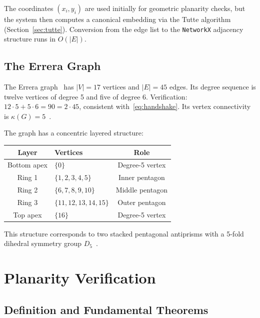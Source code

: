 \documentclass[12pt,letterpaper]{article}
\theoremstyle{plain}
\theoremstyle{definition}
\theoremstyle{remark}
\begin{document}
The coordinates $(x_i, y_i)$ are used initially for geometric planarity checks,
but the system then computes a canonical embedding via the Tutte algorithm
(Section~\ref{sec:tutte}). Conversion from the edge list to the \texttt{NetworkX}
adjacency structure runs in $O(|E|)$.

\subsection{The Errera Graph}

The Errera graph~\cite{errera1921} has $|V| = 17$ vertices and $|E| = 45$
edges. Its degree sequence is twelve vertices of degree 5 and five of degree 6.
Verification: $12 \cdot 5 + 5 \cdot 6 = 90 = 2 \cdot 45$,
consistent with~\eqref{eq:handshake}. Its vertex connectivity is
$\kappa(G) = 5$~\cite{errera1921}.

The graph has a concentric layered structure:

\begin{center}
\begin{tabular}{clc}
\toprule
\textbf{Layer} & \textbf{Vertices} & \textbf{Role} \\
\midrule
Bottom apex & $\{0\}$            & Degree-5 vertex \\
Ring 1      & $\{1,2,3,4,5\}$   & Inner pentagon \\
Ring 2      & $\{6,7,8,9,10\}$  & Middle pentagon \\
Ring 3      & $\{11,12,13,14,15\}$ & Outer pentagon \\
Top apex    & $\{16\}$           & Degree-5 vertex \\
\bottomrule
\end{tabular}
\end{center}

This structure corresponds to two stacked pentagonal antiprisms with a
5-fold dihedral symmetry group $D_5$~\cite{errera1921}.

\section{Planarity Verification}

\subsection{Definition and Fundamental Theorems}
\end{document}
